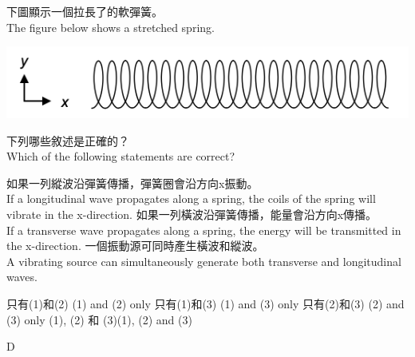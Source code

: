 


{
    下圖顯示一個拉長了的軟彈簧。\\The figure below shows a stretched spring.
    \par{\par\centering\includegraphics[width=.4\textwidth]{./img/ch1_earlyclass_wave_mc_2024-05-13-16-02-17.png}\par}
    下列哪些敘述是正確的？\\Which of the following statements are correct?
    \begin{statements}
        \task 如果一列縱波沿彈簧傳播，彈簧圈會沿方向x振動。\\If a longitudinal wave propagates along a spring, the coils of the spring will vibrate in the x-direction.
        \task 如果一列橫波沿彈簧傳播，能量會沿方向x傳播。\\If a transverse wave propagates along a spring, the energy will be transmitted in the x-direction.
        \task 一個振動源可同時產生橫波和縱波。\\A vibrating source can simultaneously generate both transverse and longitudinal waves.
    \end{statements}
    \begin{tasks}
        \task 只有(1)和(2) \tab\tab (1) and (2) only
        \task 只有(1)和(3) \tab\tab (1) and (3) only
        \task 只有(2)和(3) \tab\tab (2) and (3) only
        \task (1), (2) 和 (3)\tab\tab (1), (2) and (3)
    \end{tasks}

}{D}


